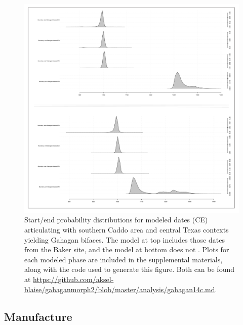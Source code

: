 \documentclass[review]{elsarticle}
\begin{document}
\begin{figure}[ht!]\centering
\includegraphics[width=\linewidth]{fig03.pdf}
\caption{Start/end probability distributions for modeled dates (CE) articulating with southern Caddo area and central Texas contexts yielding Gahagan bifaces. The model at top includes those dates from the Baker site, and the model at bottom does not \citep{RN20850}. Plots for each modeled phase are included in the supplemental materials, along with the code used to generate this figure. Both can be found at \href{https://github.com/aksel-blaise/gahaganmorph2/blob/master/analysis/gahagan14c.md}{https://github.com/aksel-blaise/gahaganmorph2/blob/master/analysis/gahagan14c.md}.}
\label{fig:fig03}
\end{figure}

\subsection*{Manufacture}
\end{document}
